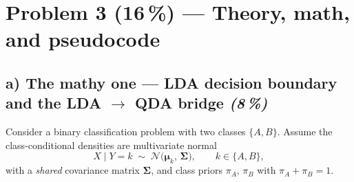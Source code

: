 \documentclass[11pt,a4paper]{article}
\newcommand{\points}[1]{\textbf{(#1\,\%)}}
\newcommand{\subpoints}[1]{\textit{(#1\,\%)}}
\begin{document}
\vfill\eject

\section*{Problem 3 \points{16} --- Theory, math, and pseudocode}

\subsection*{a) The mathy one --- LDA decision boundary and the LDA $\to$ QDA bridge \subpoints{8}}

Consider a binary classification problem with two classes $\{A, B\}$. Assume the class-conditional densities are multivariate normal
$$X \mid Y = k \;\sim\; \mathcal{N}\!\bigl(\boldsymbol\mu_k,\, \boldsymbol\Sigma\bigr), \qquad k \in \{A, B\},$$
with a \emph{shared} covariance matrix $\boldsymbol\Sigma$, and class priors $\pi_A,\,\pi_B$ with $\pi_A + \pi_B = 1$.
\end{document}
